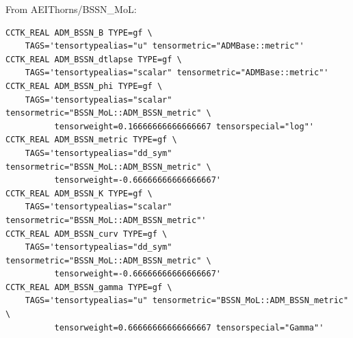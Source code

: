 From AEIThorns/BSSN\_MoL:
\begin{verbatim}
CCTK_REAL ADM_BSSN_B TYPE=gf \
    TAGS='tensortypealias="u" tensormetric="ADMBase::metric"'
CCTK_REAL ADM_BSSN_dtlapse TYPE=gf \
    TAGS='tensortypealias="scalar" tensormetric="ADMBase::metric"'
CCTK_REAL ADM_BSSN_phi TYPE=gf \
    TAGS='tensortypealias="scalar" tensormetric="BSSN_MoL::ADM_BSSN_metric" \
          tensorweight=0.16666666666666667 tensorspecial="log"'
CCTK_REAL ADM_BSSN_metric TYPE=gf \
    TAGS='tensortypealias="dd_sym" tensormetric="BSSN_MoL::ADM_BSSN_metric" \
          tensorweight=-0.66666666666666667'
CCTK_REAL ADM_BSSN_K TYPE=gf \
    TAGS='tensortypealias="scalar" tensormetric="BSSN_MoL::ADM_BSSN_metric"'
CCTK_REAL ADM_BSSN_curv TYPE=gf \
    TAGS='tensortypealias="dd_sym" tensormetric="BSSN_MoL::ADM_BSSN_metric" \
          tensorweight=-0.66666666666666667'
CCTK_REAL ADM_BSSN_gamma TYPE=gf \
    TAGS='tensortypealias="u" tensormetric="BSSN_MoL::ADM_BSSN_metric" \
          tensorweight=0.66666666666666667 tensorspecial="Gamma"'
\end{verbatim}



